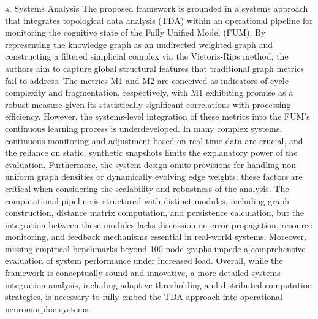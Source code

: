 \documentclass{article}
\begin{document}
a. Systems Analysis  
The proposed framework is grounded in a systems approach that integrates topological data analysis (TDA) within an operational pipeline for monitoring the cognitive state of the Fully Unified Model (FUM). By representing the knowledge graph as an undirected weighted graph and constructing a filtered simplicial complex via the Vietoris-Rips method, the authors aim to capture global structural features that traditional graph metrics fail to address. The metrics M1 and M2 are conceived as indicators of cycle complexity and fragmentation, respectively, with M1 exhibiting promise as a robust measure given its statistically significant correlations with processing efficiency. However, the systems-level integration of these metrics into the FUM’s continuous learning process is underdeveloped. In many complex systems, continuous monitoring and adjustment based on real-time data are crucial, and the reliance on static, synthetic snapshots limits the explanatory power of the evaluation. Furthermore, the system design omits provisions for handling non-uniform graph densities or dynamically evolving edge weights; these factors are critical when considering the scalability and robustness of the analysis. The computational pipeline is structured with distinct modules, including graph construction, distance matrix computation, and persistence calculation, but the integration between these modules lacks discussion on error propagation, resource monitoring, and feedback mechanisms essential in real-world systems. Moreover, missing empirical benchmarks beyond 100-node graphs impede a comprehensive evaluation of system performance under increased load. Overall, while the framework is conceptually sound and innovative, a more detailed systems integration analysis, including adaptive thresholding and distributed computation strategies, is necessary to fully embed the TDA approach into operational neuromorphic systems.
\end{document}
